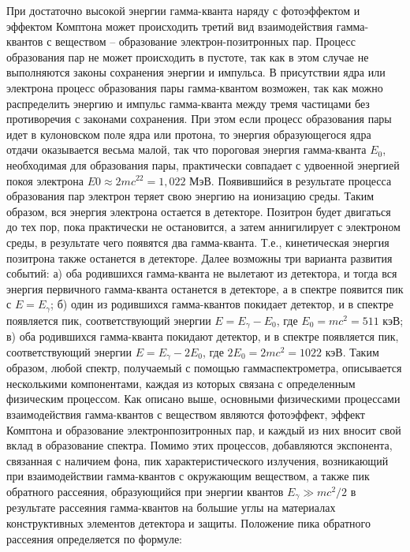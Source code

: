 При достаточно высокой энергии гамма-кванта наряду с фотоэффектом и эффектом
Комптона может происходить третий вид взаимодействия гамма-квантов с веществом –
образование электрон-позитронных пар. Процесс образования пар не может
происходить в пустоте, так как в этом случае не выполняются законы сохранения
энергии и импульса. В присутствии ядра или электрона процесс образования пары
гамма-квантом возможен, так как можно распределить энергию и импульс
гамма-кванта между тремя частицами без противоречия с законами сохранения. При
этом если процесс образования пары идет в кулоновском поле ядра или протона, то
энергия образующегося ядра отдачи оказывается весьма малой, так что пороговая
энергия гамма-кванта $E_0$, необходимая для образования пары, практически
совпадает с удвоенной энергией покоя электрона $E0 \approx 2 m c^22 = 1,022$
МэВ. Появившийся в результате процесса образования пар электрон теряет свою
энергию на ионизацию среды. Таким образом, вся энергия электрона остается в
детекторе. Позитрон будет двигаться до тех пор, пока практически не остановится,
а затем аннигилирует с электроном среды, в результате чего появятся два
гамма-кванта. Т.е., кинетическая энергия позитрона также останется в детекторе.
Далее возможны три варианта развития событий: а) оба родившихся гамма-кванта не
вылетают из детектора, и тогда вся энергия первичного гамма-кванта останется в
детекторе, а в спектре появится пик с $E = E_{\gamma}$; б) один из родившихся
гамма-квантов покидает детектор, и в спектре появляется пик, соответствующий
энергии $E = E_{\gamma} - E_0$, где $E_0= m c^2 = 511$ кэВ; в) оба родившихся
гамма-кванта покидают детектор, и в спектре появляется пик, соответствующий
энергии $E = E_{\gamma} - 2 E_0$, где $2 E_0 = 2 m c^2 = 1022$ кэВ. Таким
образом, любой спектр, получаемый с помощью гаммаспектрометра, описывается
несколькими компонентами, каждая из которых связана с определенным физическим
процессом. Как описано выше, основными физическими процессами взаимодействия
гамма-квантов с веществом являются фотоэффект, эффект Комптона и образование
электронпозитронных пар, и каждый из них вносит свой вклад в образование
спектра. Помимо этих процессов, добавляются экспонента, связанная с наличием
фона, пик характеристического излучения, возникающий при взаимодействии
гамма-квантов с окружающим веществом, а также пик обратного рассеяния,
образующийся при энергии квантов $E_{\gamma} \gg m c^2 / 2$ в результате
рассеяния гамма-квантов на большие углы на материалах конструктивных элементов
детектора и защиты. Положение пика обратного рассеяния определяется по формуле:

